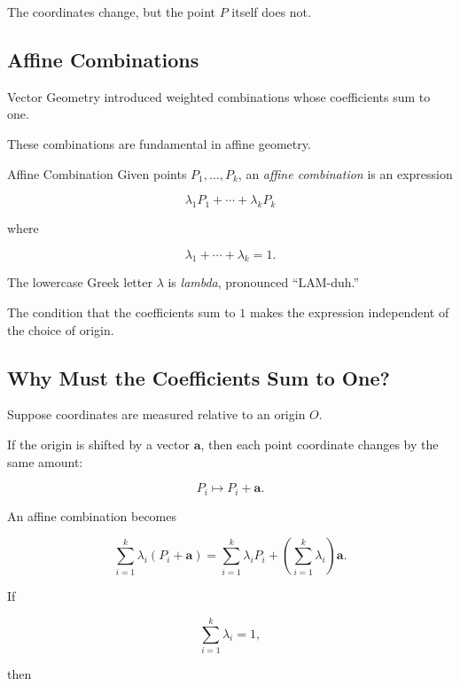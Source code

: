The coordinates change, but the point \(P\) itself does not.

\subsection{Affine Combinations}
\label{subsec:affine-combinations}

Vector Geometry introduced weighted combinations whose coefficients sum to
one.

These combinations are fundamental in affine geometry.

\begin{definitionbox}{Affine Combination}
Given points \(P_1,\ldots,P_k\), an \emph{affine combination} is an
expression

\[
\boxed{
\lambda_1P_1+\cdots+\lambda_kP_k
}
\]

where

\[
\boxed{
\lambda_1+\cdots+\lambda_k=1.
}
\]
\end{definitionbox}

The lowercase Greek letter \(\lambda\) is \emph{lambda}, pronounced
``LAM-duh.''

The condition that the coefficients sum to \(1\) makes the expression
independent of the choice of origin.

\subsection{Why Must the Coefficients Sum to One?}
\label{subsec:affine-coefficients-sum-one}

Suppose coordinates are measured relative to an origin \(O\).

If the origin is shifted by a vector \(\mathbf{a}\), then each point
coordinate changes by the same amount:

\[ P_i\mapsto P_i+\mathbf{a}. \]

An affine combination becomes

\[
\sum_{i=1}^{k}\lambda_i(P_i+\mathbf{a})
=
\sum_{i=1}^{k}\lambda_iP_i
+
\left(\sum_{i=1}^{k}\lambda_i\right)\mathbf{a}.
\]

If

\[ \sum_{i=1}^{k}\lambda_i=1, \]

then


